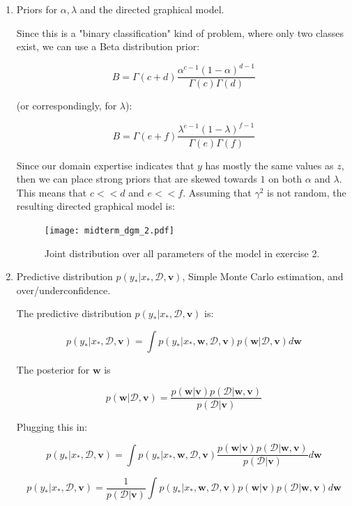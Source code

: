 \documentclass[11pt]{article}
\newcommand{\mbf}[1]{{\boldsymbol{\mathbf{#1}}}}
\renewcommand{\bm}{\mbf}
\begin{document}
\begin{enumerate}[label=\textbf{\alph*.}]
    \item Priors for $\alpha, \lambda$ and the directed graphical model.

        Since this is a "binary classification" kind of problem, where only two classes exist, we can use a Beta distribution prior:

        $$
        B = \Gamma(c+d) \dfrac{\alpha^{c-1} (1 - \alpha)^{d-1}}{\Gamma(c)\Gamma(d)}
        $$

        (or correspondingly, for $\lambda$):

        $$
        B = \Gamma(e+f) \dfrac{\lambda^{e-1} (1 - \lambda)^{f-1}}{\Gamma(e)\Gamma(f)}
        $$

        Since our domain expertise indicates that $y$ has mostly the same values as $z$, then we can place strong priors that are skewed towards $1$ on both $\alpha$ and $\lambda$. This means that $c << d$ and $e << f$. Assuming that $\gamma^2$ is not random, the resulting directed graphical model is:

        \begin{figure}[H]
            \centering
            \texttt{[image: midterm\_dgm\_2.pdf]}
            \caption{Joint distribution over all parameters of the model in exercise 2.}
        \end{figure}

    \item Predictive distribution $p(y_*|x_*, \mathcal{D}, \bm{v})$, Simple Monte Carlo estimation, and over/underconfidence.

        The predictive distribution $p(y_*|x_*, \mathcal{D}, \bm{v})$ is:

        $$
        p(y_*|x_*, \mathcal{D}, \bm{v}) = \int p(y_*|x_*, \bm{w}, \mathcal{D}, \bm{v}) p(\bm{w}|\mathcal{D}, \bm{v}) d\bm{w}
        $$

        The posterior for $\bm{w}$ is

        $$
        p(\bm{w}|\mathcal{D}, \bm{v}) = \dfrac{p(\bm{w}|\bm{v}) p(\mathcal{D}|\bm{w}, \bm{v})}{p(\mathcal{D}| \bm{v})}
        $$

        Plugging this in:

        $$
        p(y_*|x_*, \mathcal{D}, \bm{v}) = \int p(y_*|x_*, \bm{w}, \mathcal{D}, \bm{v}) \dfrac{p(\bm{w}|\bm{v}) p(\mathcal{D}|\bm{w}, \bm{v})}{p(\mathcal{D}| \bm{v})} d\bm{w}
        $$

        $$
        p(y_*|x_*, \mathcal{D}, \bm{v}) = \dfrac{1}{p(\mathcal{D}| \bm{v})} \int p(y_*|x_*, \bm{w}, \mathcal{D}, \bm{v}) p(\bm{w}|\bm{v}) p(\mathcal{D}|\bm{w}, \bm{v}) d\bm{w}
        $$


\end{enumerate}
\end{document}
